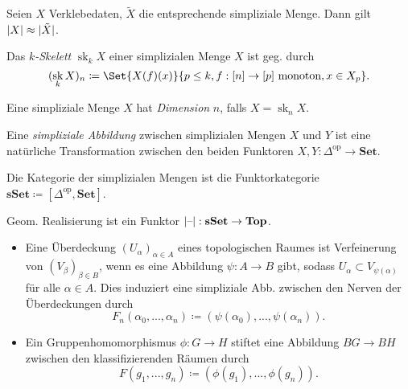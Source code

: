 \documentclass{cheat-sheet}
\newcommand{\SetC}{\mathbf{Set}} %
\newcommand{\sSet}{\mathbf{sSet}} %
\newcommand{\Top}{\mathbf{Top}} %
\newcommand{\op}{\mathrm{op}} %
\DeclareMathOperator{\sk}{sk} %
\begin{document}

\begin{prop}
  Seien $X$ Verklebedaten, $\tilde{X}$ die entsprechende simpliziale Menge. Dann gilt $\lvert X\rvert \approx \lvert\tilde{X}\rvert$.
\end{prop}

\begin{defn}
  Das \emph{$k$-Skelett} $\sk_k X$ einer simplizialen Menge $X$ ist geg. durch
  \[ (\sk_k X)_n \coloneqq \Set{ X(f)(x) }{ p \leq k, f : [n] \to [p] \text{ monoton}, x \in X_p }. \]
\end{defn}

\begin{defn}
  Eine simpliziale Menge $X$ hat \emph{Dimension} $n$, falls $X = \sk_n X$.
\end{defn}

\begin{defn}
  Eine \emph{simpliziale Abbildung} zwischen simplizialen Mengen $X$ und $Y$ ist eine natürliche Transformation zwischen den beiden Funktoren $X, Y : \Delta^\op \to \SetC$.
\end{defn}

\begin{defn}
  Die Kategorie der simplizialen Mengen ist die Funktorkategorie $\sSet \coloneqq [\Delta^\op, \SetC]$.
\end{defn}

\begin{prop}
  Geom. Realisierung ist ein Funktor $\abs{\blank} : \sSet \to \Top$.
\end{prop}

\begin{bspe}
  \begin{itemize}
    \item Eine Überdeckung $(U_\alpha)_{\alpha \in A}$ eines topologischen Raumes ist Verfeinerung von $(V_\beta)_{\beta \in B}$, wenn es eine Abbildung $\psi : A \to B$ gibt, sodass $U_\alpha \subset V_{\psi(\alpha)}$ für alle $\alpha \in A$. Dies induziert eine simpliziale Abb. zwischen den Nerven der Überdeckungen durch
    \[ F_n(\alpha_0, ..., \alpha_n) \coloneqq (\psi(\alpha_0), ..., \psi(\alpha_n)). \]
    \item Ein Gruppenhomomorphismus $\phi : G \to H$ stiftet eine Abbildung $BG \to BH$ zwischen den klassifizierenden Räumen durch
    \[ F(g_1, ..., g_n) \coloneqq (\phi(g_1), ..., \phi(g_n)). \]
  \end{itemize}
\end{bspe}
\end{document}
